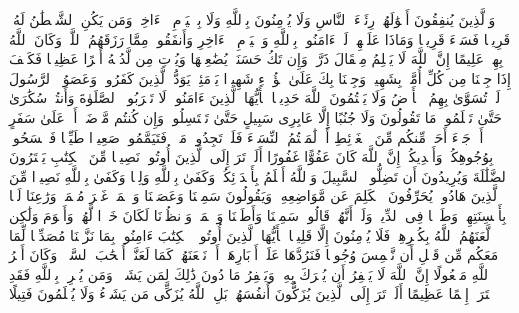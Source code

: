 \stopbuffer
\startbuffer[\q:4:38]
وَٱلَّذِینَ یُنفِقُونَ أَمۡوَٰلَهُمۡ رِئَاۤءَ ٱلنَّاسِ وَلَا یُؤۡمِنُونَ بِٱللَّهِ وَلَا بِٱلۡیَوۡمِ ٱلۡءَاخِرِۗ وَمَن یَكُنِ ٱلشَّیۡطَٰنُ لَهُۥ قَرِینࣰا فَسَاۤءَ قَرِینࣰا%
\stopbuffer
\startbuffer[\q:4:39]
وَمَاذَا عَلَیۡهِمۡ لَوۡ ءَامَنُوا۟ بِٱللَّهِ وَٱلۡیَوۡمِ ٱلۡءَاخِرِ وَأَنفَقُوا۟ مِمَّا رَزَقَهُمُ ٱللَّهُۚ وَكَانَ ٱللَّهُ بِهِمۡ عَلِیمًا%
\stopbuffer
\startbuffer[\q:4:40]
إِنَّ ٱللَّهَ لَا یَظۡلِمُ مِثۡقَالَ ذَرَّةࣲۖ وَإِن تَكُ حَسَنَةࣰ یُضَٰعِفۡهَا وَیُؤۡتِ مِن لَّدُنۡهُ أَجۡرًا عَظِیمࣰا%
\stopbuffer
\startbuffer[\q:4:41]
فَكَیۡفَ إِذَا جِئۡنَا مِن كُلِّ أُمَّةِۭ بِشَهِیدࣲ وَجِئۡنَا بِكَ عَلَىٰ هَٰۤؤُلَاۤءِ شَهِیدࣰا%
\stopbuffer
\startbuffer[\q:4:42]
یَوۡمَئِذࣲ یَوَدُّ ٱلَّذِینَ كَفَرُوا۟ وَعَصَوُا۟ ٱلرَّسُولَ لَوۡ تُسَوَّىٰ بِهِمُ ٱلۡأَرۡضُ وَلَا یَكۡتُمُونَ ٱللَّهَ حَدِیثࣰا%
\stopbuffer
\startbuffer[\q:4:43]
یَٰۤأَیُّهَا ٱلَّذِینَ ءَامَنُوا۟ لَا تَقۡرَبُوا۟ ٱلصَّلَوٰةَ وَأَنتُمۡ سُكَٰرَىٰ حَتَّىٰ تَعۡلَمُوا۟ مَا تَقُولُونَ وَلَا جُنُبًا إِلَّا عَابِرِی سَبِیلٍ حَتَّىٰ تَغۡتَسِلُوا۟ۚ وَإِن كُنتُم مَّرۡضَىٰۤ أَوۡ عَلَىٰ سَفَرٍ أَوۡ جَاۤءَ أَحَدࣱ مِّنكُم مِّنَ ٱلۡغَاۤئِطِ أَوۡ لَٰمَسۡتُمُ ٱلنِّسَاۤءَ فَلَمۡ تَجِدُوا۟ مَاۤءࣰ فَتَیَمَّمُوا۟ صَعِیدࣰا طَیِّبࣰا فَٱمۡسَحُوا۟ بِوُجُوهِكُمۡ وَأَیۡدِیكُمۡۗ إِنَّ ٱللَّهَ كَانَ عَفُوًّا غَفُورًا%
\stopbuffer
\startbuffer[\q:4:44]
أَلَمۡ تَرَ إِلَى ٱلَّذِینَ أُوتُوا۟ نَصِیبࣰا مِّنَ ٱلۡكِتَٰبِ یَشۡتَرُونَ ٱلضَّلَٰلَةَ وَیُرِیدُونَ أَن تَضِلُّوا۟ ٱلسَّبِیلَ%
\stopbuffer
\startbuffer[\q:4:45]
وَٱللَّهُ أَعۡلَمُ بِأَعۡدَاۤئِكُمۡۚ وَكَفَىٰ بِٱللَّهِ وَلِیࣰّا وَكَفَىٰ بِٱللَّهِ نَصِیرࣰا%
\stopbuffer
\startbuffer[\q:4:46]
مِّنَ ٱلَّذِینَ هَادُوا۟ یُحَرِّفُونَ ٱلۡكَلِمَ عَن مَّوَاضِعِهِۦ وَیَقُولُونَ سَمِعۡنَا وَعَصَیۡنَا وَٱسۡمَعۡ غَیۡرَ مُسۡمَعࣲ وَرَٰعِنَا لَیَّۢا بِأَلۡسِنَتِهِمۡ وَطَعۡنࣰا فِی ٱلدِّینِۚ وَلَوۡ أَنَّهُمۡ قَالُوا۟ سَمِعۡنَا وَأَطَعۡنَا وَٱسۡمَعۡ وَٱنظُرۡنَا لَكَانَ خَیۡرࣰا لَّهُمۡ وَأَقۡوَمَ وَلَٰكِن لَّعَنَهُمُ ٱللَّهُ بِكُفۡرِهِمۡ فَلَا یُؤۡمِنُونَ إِلَّا قَلِیلࣰا%
\stopbuffer
\startbuffer[\q:4:47]
یَٰۤأَیُّهَا ٱلَّذِینَ أُوتُوا۟ ٱلۡكِتَٰبَ ءَامِنُوا۟ بِمَا نَزَّلۡنَا مُصَدِّقࣰا لِّمَا مَعَكُم مِّن قَبۡلِ أَن نَّطۡمِسَ وُجُوهࣰا فَنَرُدَّهَا عَلَىٰۤ أَدۡبَارِهَاۤ أَوۡ نَلۡعَنَهُمۡ كَمَا لَعَنَّاۤ أَصۡحَٰبَ ٱلسَّبۡتِۚ وَكَانَ أَمۡرُ ٱللَّهِ مَفۡعُولًا%
\stopbuffer
\startbuffer[\q:4:48]
إِنَّ ٱللَّهَ لَا یَغۡفِرُ أَن یُشۡرَكَ بِهِۦ وَیَغۡفِرُ مَا دُونَ ذَٰلِكَ لِمَن یَشَاۤءُۚ وَمَن یُشۡرِكۡ بِٱللَّهِ فَقَدِ ٱفۡتَرَىٰۤ إِثۡمًا عَظِیمًا%
\stopbuffer
\startbuffer[\q:4:49]
أَلَمۡ تَرَ إِلَى ٱلَّذِینَ یُزَكُّونَ أَنفُسَهُمۚ بَلِ ٱللَّهُ یُزَكِّی مَن یَشَاۤءُ وَلَا یُظۡلَمُونَ فَتِیلًا%
